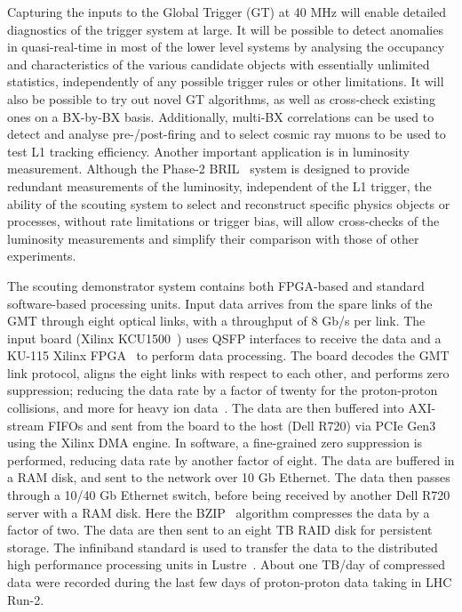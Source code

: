 \documentclass[10pt, paper=a4, UKenglish]{article}
\begin{document}
Capturing the inputs to the Global Trigger (GT) at 40 MHz will enable detailed diagnostics of the trigger system at large. It will be possible to detect anomalies in quasi-real-time in most of the lower level systems by analysing the occupancy and characteristics of the various candidate objects with essentially unlimited statistics, independently of any possible trigger rules or other limitations. It will also be possible to try out novel GT algorithms, as well as cross-check existing ones on a BX-by-BX basis. Additionally, multi-BX correlations can be used to detect and analyse pre-/post-firing and to select cosmic ray muons to be used to test L1 tracking efficiency. Another important application is in luminosity measurement. Although the Phase-2 BRIL~\cite{BRIL} system is designed to provide redundant measurements of the luminosity, independent of the L1 trigger, the ability of the scouting system to select and reconstruct specific physics objects or processes, without rate limitations or trigger bias, will allow cross-checks of the luminosity measurements and simplify their comparison with those of other experiments.


The scouting demonstrator system contains both FPGA-based and standard software-based processing units. Input data arrives from the spare links of the GMT through eight optical links, with a throughput of 8 Gb/s per link. The input board (Xilinx KCU1500~\cite{kcu}) uses QSFP interfaces to receive the data and a KU-115 Xilinx FPGA~\cite{ku115} to perform data processing. The board decodes the GMT link protocol, aligns the eight links with respect to each other, and performs zero suppression; reducing the data rate by a factor of twenty for the proton-proton collisions, and more for heavy ion data~\cite{hannes}. The data are then buffered into AXI-stream FIFOs and sent from the board to the host (Dell R720) via PCIe Gen3 using the Xilinx DMA engine. In software, a fine-grained zero suppression is performed, reducing data rate by another factor of eight. The data are buffered in a RAM disk, and sent to the network over 10 Gb Ethernet. The data then passes through a 10/40 Gb Ethernet switch, before being received by another Dell R720 server with a RAM disk. Here the BZIP~\cite{bzip} algorithm compresses the data by a factor of two. The data are then sent to an eight TB RAID disk for persistent storage. The infiniband standard is used to transfer the data to the distributed high performance processing units in Lustre~\cite{lustre}. About one TB/day of compressed data were recorded during the last few days of proton-proton data taking in LHC Run-2.
\end{document}
